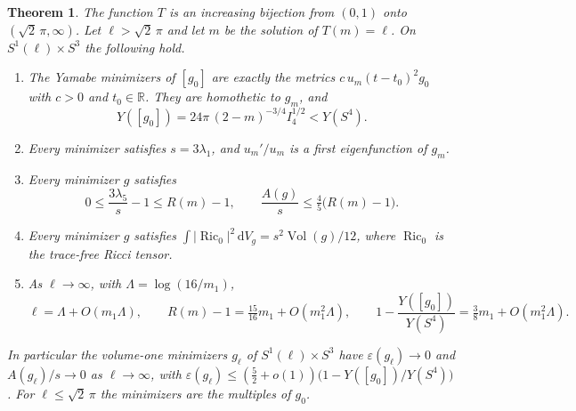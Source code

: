 \documentclass[11pt]{article}
\numberwithin{equation}{section}
\newtheorem{theorem}{Theorem}[section]
\DeclareMathOperator{\Ric}{Ric}
\DeclareMathOperator{\Vol}{Vol}
\newcommand{\dd}{\mathrm{d}}
\newcommand{\e}{\varepsilon}
\newcommand{\RR}{\mathbb{R}}
\newcommand{\Sphere}{S^4}
\newcommand{\abs}[1]{\lvert #1\rvert}
\newcommand{\dv}{\dd V_g}
\begin{document}
\begin{theorem}\label{thm:necklace}
The function \(T\) is an increasing bijection from \((0,1)\) onto
\((\sqrt2\,\pi,\infty)\). Let \(\ell>\sqrt2\,\pi\) and let \(m\) be the
solution of \(T(m)=\ell\). On \(S^1(\ell)\times S^3\) the following
hold.
\begin{enumerate}
\item[(i)] The Yamabe minimizers of \([g_0]\) are exactly the metrics
\(c\,u_m(t-t_0)^2g_0\) with \(c>0\) and \(t_0\in\RR\). They are
homothetic to \(g_m\), and
\[
 Y([g_0])=24\pi\,(2-m)^{-3/4}I_4^{1/2}<Y(\Sphere).
\]
\item[(ii)] Every minimizer satisfies \(s=3\lambda_1\), and
\(u_m'/u_m\) is a first eigenfunction of \(g_m\).
\item[(iii)] Every minimizer \(g\) satisfies
\[
 0\le\frac{3\lambda_5}{s}-1\le R(m)-1,\qquad
 \frac{A(g)}{s}\le\tfrac45\bigl(R(m)-1\bigr).
\]
\item[(iv)] Every minimizer \(g\) satisfies
\(\int\abs{\Ric_0}^2\,\dv=s^2\Vol(g)/12\), where \(\Ric_0\) is the
trace-free Ricci tensor.
\item[(v)] As \(\ell\to\infty\), with \(\Lambda=\log(16/m_1)\),
\[
 \ell=\Lambda+O(m_1\Lambda),\qquad
 R(m)-1=\tfrac{15}{16}m_1+O(m_1^2\Lambda),\qquad
 1-\frac{Y([g_0])}{Y(\Sphere)}=\tfrac38m_1+O(m_1^2\Lambda).
\]
\end{enumerate}
In particular the volume-one minimizers \(g_\ell\) of
\(S^1(\ell)\times S^3\) have \(\e(g_\ell)\to0\) and
\(A(g_\ell)/s\to0\) as \(\ell\to\infty\), with
\(\e(g_\ell)\le(\tfrac52+o(1))\bigl(1-Y([g_0])/Y(\Sphere)\bigr)\).
For \(\ell\le\sqrt2\,\pi\) the minimizers are the multiples of \(g_0\).
\end{theorem}
\end{document}
